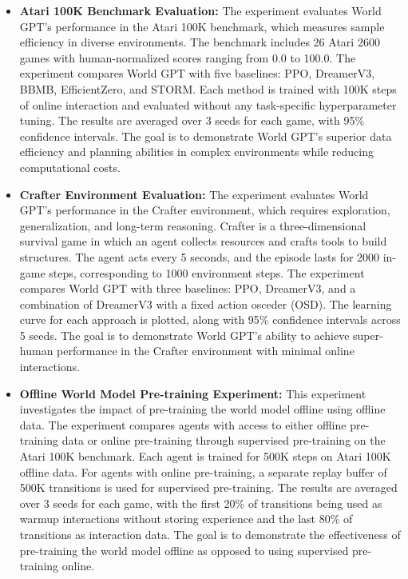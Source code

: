 \begin{itemize}
    \item \textbf{Atari 100K Benchmark Evaluation:} The experiment evaluates World GPT's performance in the Atari 100K benchmark, which measures sample efficiency in diverse environments. The benchmark includes 26 Atari 2600 games with human-normalized scores ranging from 0.0 to 100.0. The experiment compares World GPT with five baselines: PPO, DreamerV3, BBMB, EfficientZero, and STORM. Each method is trained with 100K steps of online interaction and evaluated without any task-specific hyperparameter tuning. The results are averaged over 3 seeds for each game, with 95\% confidence intervals. The goal is to demonstrate World GPT's superior data efficiency and planning abilities in complex environments while reducing computational costs.
    
    \item \textbf{Crafter Environment Evaluation:} The experiment evaluates World GPT's performance in the Crafter environment, which requires exploration, generalization, and long-term reasoning. Crafter is a three-dimensional survival game in which an agent collects resources and crafts tools to build structures. The agent acts every 5 seconds, and the episode lasts for 2000 in-game steps, corresponding to 1000 environment steps. The experiment compares World GPT with three baselines: PPO, DreamerV3, and a combination of DreamerV3 with a fixed action osceder (OSD). The learning curve for each approach is plotted, along with 95\% confidence intervals across 5 seeds. The goal is to demonstrate World GPT's ability to achieve super-human performance in the Crafter environment with minimal online interactions.
    
    \item \textbf{Offline World Model Pre-training Experiment:} This experiment investigates the impact of pre-training the world model offline using offline data. The experiment compares agents with access to either offline pre-training data or online pre-training through supervised pre-training on the Atari 100K benchmark. Each agent is trained for 500K steps on Atari 100K offline data. For agents with online pre-training, a separate replay buffer of 500K transitions is used for supervised pre-training. The results are averaged over 3 seeds for each game, with the first 20\% of transitions being used as warmup interactions without storing experience and the last 80\% of transitions as interaction data. The goal is to demonstrate the effectiveness of pre-training the world model offline as opposed to using supervised pre-training online.
    

\end{itemize}
